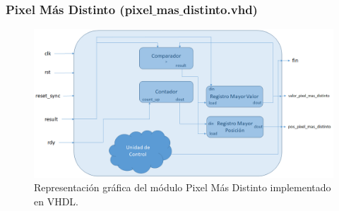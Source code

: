 \subsubsection{Pixel Más Distinto (pixel$\_$mas$\_$distinto.vhd)}

\begin{figure}
  \centering
    \includegraphics[width=1\textwidth]{Imagenes/DiagramaModuloPixelMasDistinto.png}
  \caption{Representación gráfica del módulo Pixel Más Distinto implementado en VHDL.}
  \label{fig:modulo pixel mas distinto vhdl}
\end{figure}

